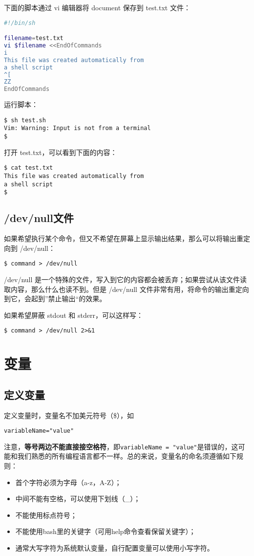 下面的脚本通过 vi 编辑器将 document 保存到 test.txt 文件：
\begin{lstlisting}[language=sh]
#!/bin/sh

filename=test.txt
vi $filename <<EndOfCommands
i
This file was created automatically from
a shell script
^[
ZZ
EndOfCommands
\end{lstlisting}
运行脚本：
\begin{verbatim}
$ sh test.sh
Vim: Warning: Input is not from a terminal
$
\end{verbatim}
打开 test.txt，可以看到下面的内容：
\begin{verbatim}
$ cat test.txt
This file was created automatically from
a shell script
$
\end{verbatim}


\subsection{/dev/null文件}
如果希望执行某个命令，但又不希望在屏幕上显示输出结果，那么可以将输出重定向到 /dev/null：

\verb|$ command > /dev/null|

/dev/null 是一个特殊的文件，写入到它的内容都会被丢弃；如果尝试从该文件读取内容，那么什么也读不到。但是 /dev/null 文件非常有用，将命令的输出重定向到它，会起到”禁止输出“的效果。

如果希望屏蔽 stdout 和 stderr，可以这样写：

\verb|$ command > /dev/null 2>&1|






\section{变量}
\subsection{定义变量}
定义变量时，变量名不加美元符号（\$），如

\verb|variableName="value"|

注意，\textbf{等号两边不能直接接空格符}，即\verb*|variableName = "value"|是错误的，这可能和我们熟悉的所有编程语言都不一样。总的来说，变量名的命名须遵循如下规则：
\begin{itemize}
\item 首个字符必须为字母（a-z，A-Z）；
\item 中间不能有空格，可以使用下划线（\_）；
\item 不能使用标点符号；
\item 不能使用bash里的关键字（可用help命令查看保留关键字）；
\item 通常大写字符为系统默认变量，自行配置变量可以使用小写字符。
\end{itemize}

